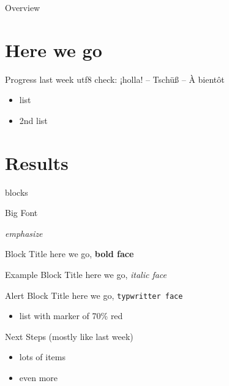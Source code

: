 
\begin{frame}{Overview}
  \tableofcontents
\end{frame}

\section{Here we go}

\begin{frame}{Progress last week}
  utf8 check: ¡holla! – Tschüß – À bientôt
  \begin{itemize}
    \item list
    \item 2nd list
  \end{itemize}
\end{frame}


\section{Results}

\begin{frame}{blocks}
  \begin{huge}Big Font\end{huge}  \emph{emphasize}
  \begin{block}{Block Title}
    here we go,  \textbf{bold face}
  \end{block}
  
  \begin{exampleblock}{Example Block Title}
    here we go, \textit{italic face}
  \end{exampleblock}
  
  \begin{alertblock}{Alert Block Title}
    here we go, \texttt{typwritter face}
    \begin{itemize}
      \item list with marker of 70\% red
    \end{itemize}

  \end{alertblock}
\end{frame}


\begin{frame}{Next Steps (mostly like last  week)}  
  \begin{itemize}
    \item lots of items
    \item even more
  \end{itemize}

\end{frame}

